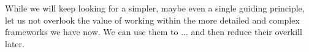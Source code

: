 



While we will keep looking for a simpler, maybe even a single guiding principle, let us not overlook the value of working within the more detailed and complex frameworks we have now. We can use them to ... and then reduce their overkill later.